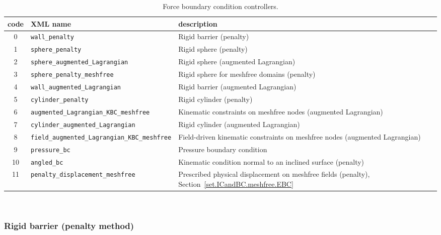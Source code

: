 \begin{table}[h]
\caption{\label{tab.FBC.controller.type} Force boundary condition controllers.}
\begin{center}
{\small
\begin{tabular}[c]{|c|p{3.05in}|>{\raggedright\arraybackslash}p{2.45in}|}
\hline
\textbf{code} & \textbf{XML name} & \textbf{description}\\
\hline
0 & \texttt{wall\_penalty} & Rigid barrier (penalty)\\
\hline
1 & \texttt{sphere\_penalty} & Rigid sphere (penalty)\\
\hline
2 & \texttt{sphere\_augmented\_Lagrangian} & Rigid sphere (augmented Lagrangian)\\
\hline
3 & \texttt{sphere\_penalty\_meshfree} & Rigid sphere for meshfree domains (penalty)\\
\hline
4 & \texttt{wall\_augmented\_Lagrangian} & Rigid barrier (augmented Lagrangian)\\
\hline
5 & \texttt{cylinder\_penalty} & Rigid cylinder (penalty)\\
\hline
6 & \texttt{augmented\_Lagrangian\_KBC\_meshfree} & Kinematic constraints on meshfree nodes (augmented Lagrangian)\\
\hline
7 & \texttt{cylinder\_augmented\_Lagrangian} & Rigid cylinder (augmented Lagrangian)\\
\hline
8 & \texttt{field\_augmented\_Lagrangian\_KBC\_meshfree} & Field-driven kinematic constraints on meshfree nodes (augmented Lagrangian)\\
\hline
9 & \texttt{pressure\_bc} & Pressure boundary condition\\
\hline
10 & \texttt{angled\_bc} & Kinematic condition normal to an inclined surface (penalty)\\
\hline
11 & \texttt{penalty\_displacement\_meshfree} & Prescribed physical displacement on meshfree fields (penalty), Section~\ref{set.ICandBC.meshfree.EBC}\\
\hline
\end{tabular}}
\end{center}
\end{table}

\\

\subsubsection{Rigid barrier (penalty method)}
